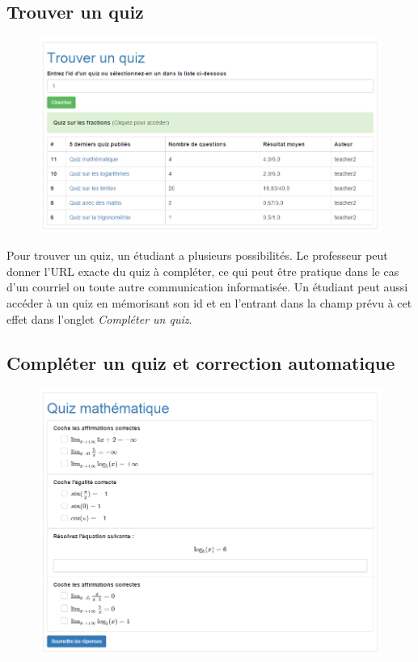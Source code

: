 \documentclass[a4,10pt,french]{sphinxmanual}
\begin{document}
\subsection{Trouver un quiz}
\label{doc-user:trouver-un-quiz}\begin{figure}[htbp]
\centering

\includegraphics{find.png}
\end{figure}

Pour trouver un quiz, un étudiant a plusieurs possibilités. Le professeur peut donner l'URL exacte du quiz à compléter, ce qui peut être pratique dans le cas d'un courriel ou toute autre communication informatisée. Un étudiant peut aussi accéder à un quiz en mémorisant son id et en l'entrant dans la champ prévu à cet effet dans l'onglet \emph{Compléter un quiz}.


\subsection{Compléter un quiz et correction automatique}
\label{doc-user:completer-un-quiz-et-correction-automatique}\begin{figure}[htbp]
\centering

\includegraphics{complete.png}
\end{figure}
\end{document}
